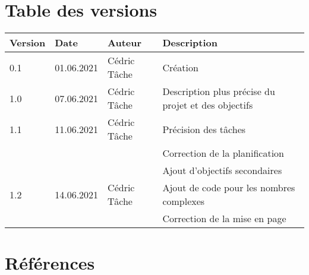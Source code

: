 \documentclass[french,11pt]{article}
\begin{document}


\section *{Table des versions}
\vspace*{0.5 cm}

\begin{table}[h]
    \begin{tabularx}{\columnwidth}{ | p{1.5cm} | p{1.7cm} | p{2.5cm} | X |}
        \hline
        \textbf{Version} & \textbf{Date} & \textbf{Auteur} & \textbf{Description} \\
        \hline
        0.1 & 01.06.2021 & Cédric Tâche & Création \\
        1.0 & 07.06.2021 & Cédric Tâche & Description plus précise du projet et des objectifs \\
        1.1 & 11.06.2021 & Cédric Tâche & Précision des tâches \\
         & & & Correction de la planification \\
         & & & Ajout d'objectifs secondaires \\
        1.2 & 14.06.2021 & Cédric Tâche & Ajout de code pour les nombres complexes \\
         & & & Correction de la mise en page \\
        \hline
    \end{tabularx}
\end{table}


\newpage

\hypersetup{
	hidelinks,
	allcolors=black,
	linktocpage,
	linktoc=all
}

\tableofcontents

\newpage




\section{Références}

\renewcommand{\bibsection}{}

\end{document}

